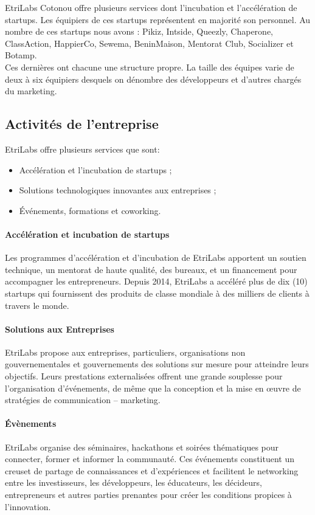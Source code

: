 EtriLabs Cotonou offre plusieurs services dont l’incubation et l’accélération de startups. Les équipiers de ces startups représentent en majorité son personnel. Au nombre de ces startups nous avons : Pikiz, Intside, Queezly, Chaperone, ClassAction, HappierCo, Sewema, BeninMaison, Mentorat Club, Socializer et Botamp.
\\Ces dernières ont chacune une structure propre. La taille des équipes varie de deux à six équipiers desquels on dénombre des développeurs et d’autres chargés du marketing.

\subsection{Activités de l’entreprise}
EtriLabs offre plusieurs services que sont:

\begin{itemize}
\item[\textbullet] Accélération et l'incubation de startups ;
\item[\textbullet] Solutions technologiques innovantes aux entreprises ;
\item[\textbullet] Événements, formations et coworking.
\end{itemize}


\paragraph{Accélération et incubation de startups}
$ $\\Les programmes d'accélération et d’incubation de EtriLabs apportent un soutien technique, un mentorat de haute qualité, des bureaux, et un financement pour accompagner les entrepreneurs.
Depuis 2014, EtriLabs a accéléré plus de dix (10) startups qui fournissent des produits de classe mondiale à des milliers de clients à travers le monde.

\paragraph{Solutions aux Entreprises}
$ $\\EtriLabs propose aux entreprises, particuliers, organisations non gouvernementales et gouvernements des solutions sur mesure pour atteindre leurs objectifs. Leurs prestations externalisées offrent une grande souplesse pour l’organisation d’événements, de même que la conception et la mise en œuvre de stratégies de communication – marketing.
\newpage
\paragraph{Évènements}
$ $\\EtriLabs organise des séminaires, hackathons et soirées thématiques pour connecter, former et informer la communauté. Ces événements constituent un creuset de partage de connaissances et d’expériences et facilitent le networking entre les investisseurs, les développeurs, les éducateurs, les décideurs, entrepreneurs et autres parties prenantes pour créer les conditions propices à l’innovation.

